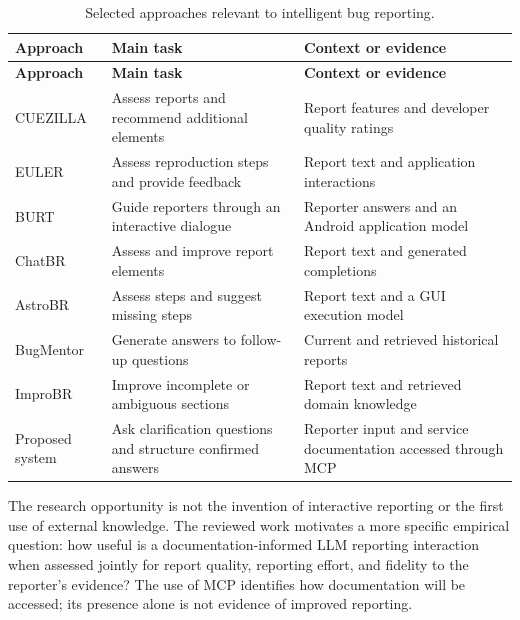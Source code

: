 \begingroup
\small
\setlength{\tabcolsep}{4pt}
\renewcommand{\arraystretch}{1.15}
\begin{longtable}{@{}>{\raggedright\arraybackslash}p{}>{\raggedright\arraybackslash}p{}>{\raggedright\arraybackslash}p{}@{}}
\caption{Selected approaches relevant to intelligent bug reporting.}\label{tab:reporting-approaches}\\
\toprule
\textbf{Approach} & \textbf{Main task} & \textbf{Context or evidence} \\
\midrule
\endfirsthead
\toprule
\textbf{Approach} & \textbf{Main task} & \textbf{Context or evidence} \\
\midrule
\endhead
\bottomrule
\endfoot
CUEZILLA \cite{zimmermann2010} & Assess reports and recommend additional elements & Report features and developer quality ratings \\
EULER \cite{chaparro2019} & Assess reproduction steps and provide feedback & Report text and application interactions \\
BURT \cite{song2022} & Guide reporters through an interactive dialogue & Reporter answers and an Android application model \\
ChatBR \cite{chatbr2024} & Assess and improve report elements & Report text and generated completions \\
AstroBR \cite{mahmud2025} & Assess steps and suggest missing steps & Report text and a GUI execution model \\
BugMentor \cite{bugmentor2026} & Generate answers to follow-up questions & Current and retrieved historical reports \\
ImproBR \cite{akyol2026} & Improve incomplete or ambiguous sections & Report text and retrieved domain knowledge \\
Proposed system & Ask clarification questions and structure confirmed answers & Reporter input and service documentation accessed through MCP \\
\end{longtable}
\endgroup

The research opportunity is not the invention of interactive reporting or the first use of external knowledge. The reviewed work motivates a more specific empirical question: how useful is a documentation-informed LLM reporting interaction when assessed jointly for report quality, reporting effort, and fidelity to the reporter's evidence? The use of MCP identifies how documentation will be accessed; its presence alone is not evidence of improved reporting.

